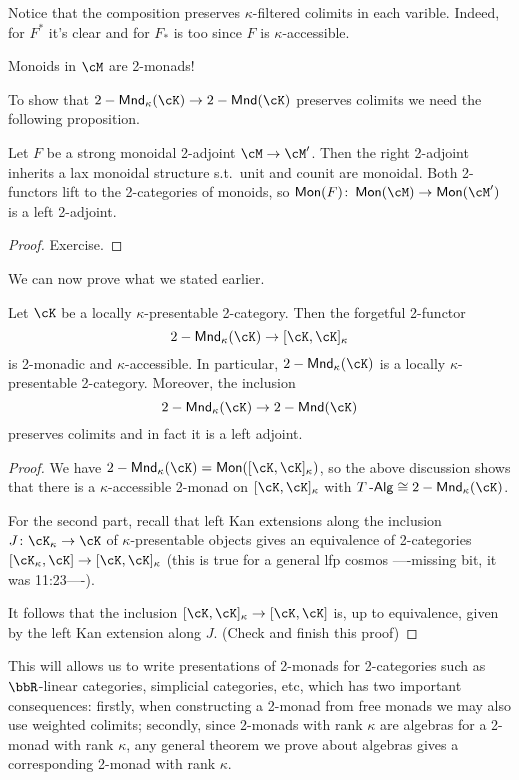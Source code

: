 \documentclass[a4paper,11pt,oneside,openany]{scrbook}
\begin{document}
Notice that the composition preserves $\kappa$-filtered colimits in each
varible. Indeed, for $F^*$ it's clear and for $F_*$ is too since $F$ is
$\kappa$-accessible.

Monoids in $\cM$ are 2-monads!

To show that $2-\Mnd_\kappa(\cK)\rightarrow 2-\Mnd(\cK)$ preserves colimits we
need the following proposition.

\begin{prop}
    Let $F$ be a strong monoidal 2-adjoint $\cM\rightarrow\cM'$. Then the right
    2-adjoint inherits a lax monoidal structure s.t.\ unit and counit are
    monoidal. Both 2-functors lift to the 2-categories of monoids, so
    $\Mon(F)\colon\Mon(\cM)\rightarrow\Mon(\cM')$ is a left 2-adjoint.
\end{prop}
\begin{proof}
    Exercise.
\end{proof}

We can now prove what we stated earlier.

\begin{thm}
    Let $\cK$ be a locally $\kappa$-presentable 2-category. Then the forgetful
    2-functor
    \[
        2-\Mnd_\kappa(\cK)\rightarrow[\cK,\cK]_\kappa
    \]
    is 2-monadic and $\kappa$-accessible. In particular, $2-\Mnd_\kappa(\cK)$ is
    a locally $\kappa$-presentable 2-category.
    Moreover, the inclusion
    \[
        2-\Mnd_\kappa(\cK)\rightarrow 2-\Mnd(\cK)
    \]
    preserves colimits and in fact it is a left adjoint.
\end{thm}
\begin{proof}
    We have $2-\Mnd_\kappa(\cK)=\Mon([\cK,\cK]_\kappa)$, so the above discussion
    shows that there is a $\kappa$-accessible 2-monad on $[\cK,\cK]_\kappa$ with
    $T\Alg\cong 2-\Mnd_\kappa(\cK)$.

    For the second part, recall that left Kan extensions along the inclusion
    $J\colon\cK_\kappa\rightarrow\cK$ of $\kappa$-presentable objects gives an
    equivalence of 2-categories $[\cK_\kappa,\cK]\rightarrow[\cK,\cK]_\kappa$
    (this is true for a general lfp cosmos ----missing bit, it was 11:23----).

    It follows that the inclusion $[\cK,\cK]_\kappa\rightarrow[\cK,\cK]$ is, up
    to equivalence, given by the left Kan extension along $J$. (Check and finish
    this proof)
\end{proof}

This will allows us to write presentations of 2-monads for 2-categories such as
$\bbR$-linear categories, simplicial categories, etc, which has two important
consequences: firstly, when constructing a 2-monad from free monads we may also
use weighted colimits; secondly, since 2-monads with rank $\kappa$ are algebras
for a 2-monad with rank $\kappa$, any general theorem we prove about algebras
gives a corresponding 2-monad with rank $\kappa$.
\end{document}
